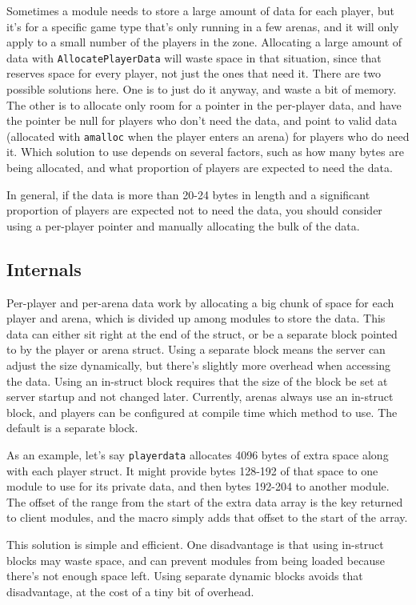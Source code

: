 \documentclass{article}
\begin{document}
Sometimes a module needs to store a large amount of data for each
player, but it's for a specific game type that's only running in a few
arenas, and it will only apply to a small number of the players in the
zone. Allocating a large amount of data with \verb/AllocatePlayerData/
will waste space in that situation, since that reserves space for every
player, not just the ones that need it. There are two possible solutions
here. One is to just do it anyway, and waste a bit of memory. The other
is to allocate only room for a pointer in the per-player data, and have
the pointer be null for players who don't need the data, and point to
valid data (allocated with \verb/amalloc/ when the player enters an
arena) for players who do need it. Which solution to use depends on
several factors, such as how many bytes are being allocated, and what
proportion of players are expected to need the data.

In general, if the data is more than 20-24 bytes in length and a
significant proportion of players are expected not to need the data, you
should consider using a per-player pointer and manually allocating the
bulk of the data.


\subsection{Internals}

Per-player and per-arena data work by allocating a big chunk of space
for each player and arena, which is divided up among modules to store
the data. This data can either sit right at the end of the struct, or be
a separate block pointed to by the player or arena struct. Using a
separate block means the server can adjust the size dynamically, but
there's slightly more overhead when accessing the data. Using an
in-struct block requires that the size of the block be set at server
startup and not changed later. Currently, arenas always use an in-struct
block, and players can be configured at compile time which method to
use. The default is a separate block.

As an example, let's say \verb/playerdata/ allocates 4096 bytes of extra
space along with each player struct. It might provide bytes 128-192 of
that space to one module to use for its private data, and then bytes
192-204 to another module. The offset of the range from the start of the
extra data array is the key returned to client modules, and the macro
simply adds that offset to the start of the array.

This solution is simple and efficient. One disadvantage is that using
in-struct blocks may waste space, and can prevent modules from being
loaded because there's not enough space left. Using separate dynamic
blocks avoids that disadvantage, at the cost of a tiny bit of overhead.
\end{document}
